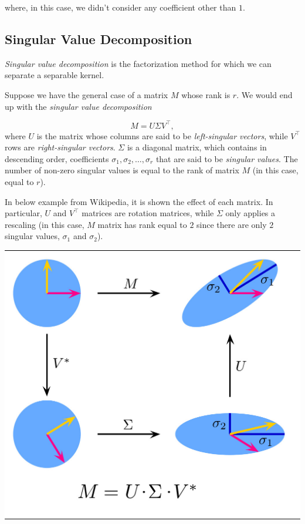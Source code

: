 \documentclass[10pt]{report}
\begin{document}
where, in this case, we didn't consider any coefficient other than
\(1\).

\subsection{Singular Value Decomposition}
\label{singular-value-decomposition}
\emph{Singular value decomposition} is the factorization method for which we
can separate a separable kernel.

Suppose we have the general case of a matrix \(M\) whose rank is \(r\).
We would end up with the \emph{singular value decomposition}

\[M = U \Sigma V^\top,\] where \(U\) is the matrix whose columns are
said to be \emph{left-singular vectors}, while \(V^\top\) rows are
\emph{right-singular vectors}. \(\Sigma\) is a diagonal matrix, which
contains in descending order, coefficients
\(\sigma_1, \sigma_2, \dots, \sigma_r\) that are said to be \emph{singular
values}. The number of non-zero singular values is equal to the rank of
matrix \(M\) (in this case, equal to \(r\)).

In below example from Wikipedia, it is shown the effect of each matrix.
In particular, \(U\) and \(V^\top\) matrices are rotation matrices,
while \(\Sigma\) only applies a rescaling (in this case, \(M\) matrix
has rank equal to \(2\) since there are only \(2\) singular values,
\(\sigma_1\) and \(\sigma_2\)).

\begin{center}
\includegraphics[width=.9\linewidth]{./pics/proc/svd-wiki.jpg}
\end{center}
\end{document}
